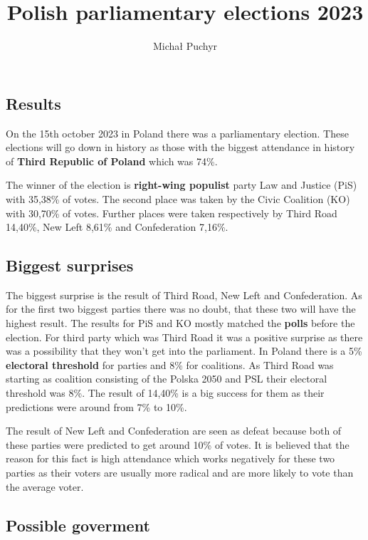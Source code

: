 \documentclass[12pt]{article}
\author{Michał Puchyr}
\title{\textbf{Polish parliamentary elections 2023}}
\begin{document}
\maketitle

\subsection*{Results}

On the 15th october 2023 in Poland there was a parliamentary election.
These elections will go down in history as those with the biggest attendance in history of \textbf{Third Republic of Poland} which was 74\%.

The winner of the election is \textbf{right-wing populist} party Law and Justice (PiS) with 35,38\% of votes.
The second place was taken by the Civic Coalition (KO) with 30,70\% of votes.
Further places were taken respectively by Third Road 14,40\%, New Left 8,61\% and Confederation 7,16\%.

\subsection*{Biggest surprises}

The biggest surprise is the result of Third Road, New Left and Confederation. As for the first two biggest parties there was no doubt, that these
two will have the highest result. The results for PiS and KO mostly matched the \textbf{polls} before the election. For third party which was Third Road it was
a positive surprise as there was a possibility that they won't get into the parliament. In Poland there is a 5\% \textbf{electoral threshold} for parties and 8\% for coalitions.
As Third Road was starting as coalition consisting of the Polska 2050 and PSL their electoral threshold was 8\%. The result of 14,40\% is a big success for them as their predictions were around from 7\% to 10\%.

\smallskip

The result of New Left and Confederation are seen as defeat because both of these parties were predicted to get around 10\% of votes. It is believed that the reason for this fact is 
high attendance which works negatively for these two parties as their voters are usually more radical and are more likely to vote than the average voter.

\subsection*{Possible goverment}
\end{document}
